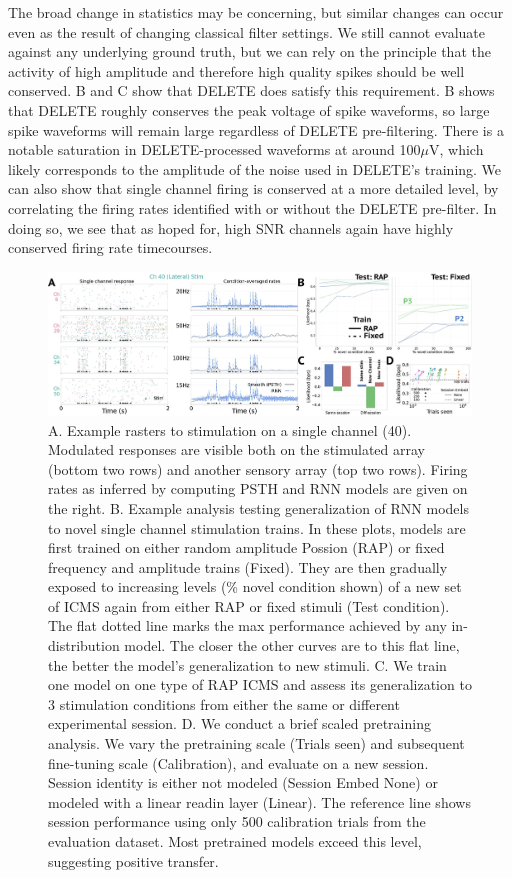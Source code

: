 \documentclass[12pt,oneside]{report}
\begin{document}
The broad change in statistics may be concerning, but similar changes can occur even as the result of changing classical filter settings. We still cannot evaluate against any underlying ground truth, but we can rely on the principle that the activity of high amplitude and therefore high quality spikes should be well conserved. B and C show that DELETE does satisfy this requirement. B shows that DELETE roughly conserves the peak voltage of spike waveforms, so large spike waveforms will remain large regardless of DELETE pre-filtering. There is a notable saturation in DELETE-processed waveforms at around 100$\mu$V, which likely corresponds to the amplitude of the noise used in DELETE’s training. We can also show that single channel firing is conserved at a more detailed level, by correlating the firing rates identified with or without the DELETE pre-filter. In doing so, we see that as hoped for, high SNR channels again have highly conserved firing rate timecourses.



\begin{figure}[h]
  \centering
  \includegraphics[width=1.0\linewidth]{ch4_icms_taxonomy.png}
  \caption{A. Example rasters to stimulation on a single channel (40). Modulated responses are visible both on the stimulated array (bottom two rows) and another sensory array (top two rows). Firing rates as inferred by computing PSTH and RNN models are given on the right. B. Example analysis testing generalization of RNN models to novel single channel stimulation trains. In these plots, models are first trained on either random amplitude Possion (RAP) or fixed frequency and amplitude trains (Fixed). They are then gradually exposed to increasing levels (\% novel condition shown) of a new set of ICMS again from either RAP or fixed stimuli (Test condition). The flat dotted line marks the max performance achieved by any in-distribution model. The closer the other curves are to this flat line, the better the model's generalization to new stimuli. C. We train one model on one type of RAP ICMS and assess its generalization to 3 stimulation conditions from either the same or different experimental session. D. We conduct a brief scaled pretraining analysis. We vary the pretraining scale (Trials seen) and subsequent fine-tuning scale (Calibration), and evaluate on a new session. Session identity is either not modeled (Session Embed None) or modeled with a linear readin layer (Linear). The reference line shows session performance using only 500 calibration trials from the evaluation dataset. Most pretrained models exceed this level, suggesting positive transfer.}
  \label{fig:icms_taxonomy}
\end{figure}
\end{document}
